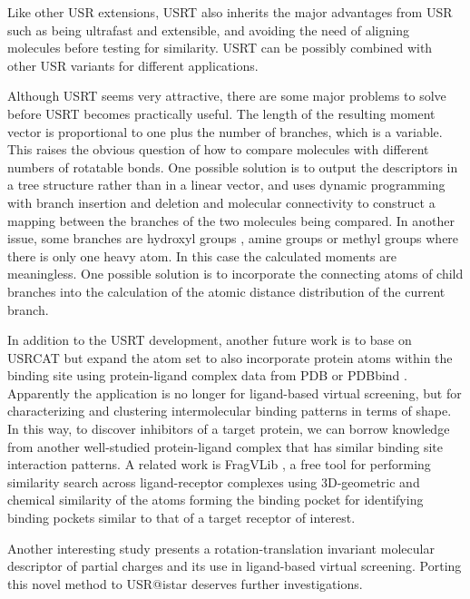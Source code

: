 Like other USR extensions, USRT also inherits the major advantages from USR such as being ultrafast and extensible, and avoiding the need of aligning molecules before testing for similarity. USRT can be possibly combined with other USR variants \citep{1333,1338,1331} for different applications.

Although USRT seems very attractive, there are some major problems to solve before USRT becomes practically useful. The length of the resulting moment vector is proportional to one plus the number of branches, which is a variable. This raises the obvious question of how to compare molecules with different numbers of rotatable bonds. One possible solution is to output the descriptors in a tree structure rather than in a linear vector, and uses dynamic programming with branch insertion and deletion and molecular connectivity to construct a mapping between the branches of the two molecules being compared. In another issue, some branches are hydroxyl groups , amine groups  or methyl groups  where there is only one heavy atom. In this case the calculated moments are meaningless. One possible solution is to incorporate the connecting atoms of child branches into the calculation of the atomic distance distribution of the current branch.

In addition to the USRT development, another future work is to base on USRCAT \citep{1331} but expand the atom set to also incorporate protein atoms within the binding site using protein-ligand complex data from PDB \citep{540,537} or PDBbind \citep{529,530,1426}. Apparently the application is no longer for ligand-based virtual screening, but for characterizing and clustering intermolecular binding patterns in terms of shape. In this way, to discover inhibitors of a target protein, we can borrow knowledge from another well-studied protein-ligand complex that has similar binding site interaction patterns. A related work is FragVLib \citep{1247}, a free tool for performing similarity search across ligand-receptor complexes using 3D-geometric and chemical similarity of the atoms forming the binding pocket for identifying binding pockets similar to that of a target receptor of interest.%

Another interesting study \citep{1389} presents a rotation-translation invariant molecular descriptor of partial charges and its use in ligand-based virtual screening. Porting this novel method to USR@istar deserves further investigations.

\chapterend

